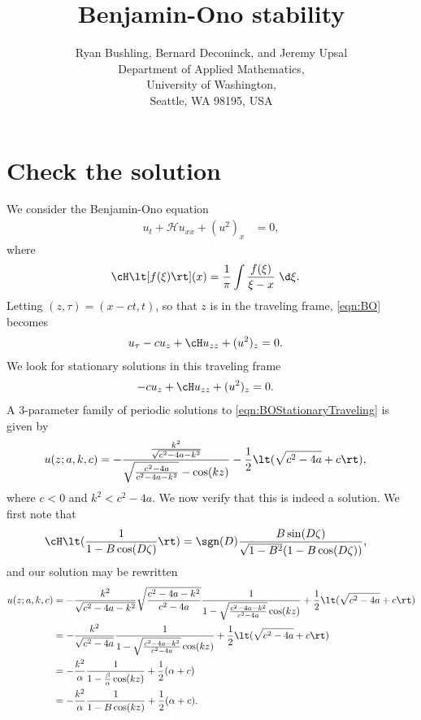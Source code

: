 \documentclass[a4paper,10pt]{article}
\title{Benjamin-Ono stability}
\author{Ryan Bushling, Bernard Deconinck, and Jeremy Upsal
  \\
Department of Applied Mathematics,\\
University of Washington,\\
Seattle, WA 98195, USA}
\begin{document}
\maketitle

\section{Check the solution}

We consider the Benjamin-Ono equation
\begin{align}
  u_t + \mathcal{H}u_{xx} + (u^2)_x &=0,\label{eqn:BO}
\end{align}
where
\begin{align}
  \cH \lt[f(\xi)\rt](x) &= \frac1\pi \int \frac{f(\xi)}{\xi - x}~\d \xi.
\end{align}
Letting $(z,\tau) = (x-ct, t)$, so that $z$ is in the traveling frame,
\eqref{eqn:BO} becomes
\begin{align}
  u_\tau - cu_z + \cH u_{zz} + (u^2)_z &=0.\label{eqn:BOtravel}
\end{align}
We look for stationary solutions in this traveling frame
\begin{align}
  -c u_z + \cH u_{zz} + (u^2)_z &=0. \label{eqn:BOStationaryTraveling}
\end{align}
A 3-parameter family of periodic solutions to \eqref{eqn:BOStationaryTraveling}
is \cite{bronski2016modulational} given by
\begin{align}
  u(z; a, k, c) &=
  -\frac{\frac{k^2}{\sqrt{c^2-4a-k^2}}}{\sqrt{\frac{c^2-4a}{c^2-4a-k^2}} -
  \cos(kz)} - \frac12 \lt(\sqrt{c^2-4a}+c\rt),
  \label{eqn:BOsoln}
\end{align}
where $c<0$ and $k^2<c^2-4a$.  We now verify that this is indeed a solution. We
first note that \cite{ono1975}
\begin{align}
	\cH \lt(\frac{1}{1-B\cos(D\zeta)}\rt) &= \sgn(D) \frac{B
	\sin(D\zeta)}{\sqrt{1-B^2}(1-B\cos(D\zeta))},
\end{align}
and our solution may be rewritten
\begin{align}
   u(z;a,k,c) &= -\frac{k^2}{\sqrt{c^2-4a-k^2}} \sqrt{\frac{c^2-4a-k^2}{c^2-4a}}
   \frac{1}{ 1 - \sqrt{\frac{c^2-4a-k^2}{c^2-4a}}\cos(kz)} + \frac12
   \lt(\sqrt{c^2-4a}+c\rt)\\
   &= -\frac{k^2}{\sqrt{c^2-4a}}
   \frac{1}{ 1 - \sqrt{\frac{c^2-4a-k^2}{c^2-4a}}\cos(kz)} + \frac12
   \lt(\sqrt{c^2-4a}+c\rt)\\
   &= -\frac{k^2}{\alpha}\frac{1}{1-\frac{\beta}{\alpha}\cos(kz)} + \frac12(\alpha + c)\\
   &= -\frac{k^2}{\alpha}\frac{1}{1-B \cos (k z)} + \frac12( \alpha + c).
   \label{eqn:soln}
\end{align}
\end{document}
